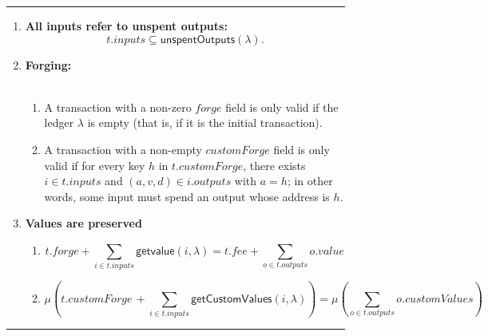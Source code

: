\documentclass[a4paper]{article}
\newcommand{\s}{\textsf}  %
\theoremstyle{definition}  %
\newcommand\rfskip{7pt}
\newenvironment{ruledfigure}[1]{\begin{figure}[#1]\hrule\vspace{\rfskip}}{\vspace{\rfskip}\hrule\end{figure}}
\newcommand{\mi}[1]{\ensuremath{\mathit{#1}}}
\newcommand{\inputs}{\mi{inputs}}
\newcommand{\outputs}{\mi{outputs}}
\newcommand{\forge}{\mi{forge}}
\newcommand{\fee}{\mi{fee}}
\newcommand{\val}{\mi{value}}  %
\newcommand{\customvals}{\mi{customValues}}
\newcommand{\customforge}{\mi{customForge}}
\newcommand{\getvalue}{\msf{getvalue}}
\newcommand{\msf}[1]{\ensuremath{\mathsf{#1}}}
\newcommand{\unspent}{\msf{unspentOutputs}}
\begin{document}
\begin{ruledfigure}{H}
  \begin{enumerate}
    \item \label{rule:all-inputs-refer-to-unspent-outputs-2} \textbf{All
      inputs refer to unspent outputs:}
      \[
        t.\inputs \subseteq \unspent(\lambda).
      \]
    \item\textbf{Forging:}\\\\
      \begin{minipage}{0.85\textwidth}
          \begin{enumerate}
          \item
              A transaction with a non-zero \forge{} field is only
            valid if the ledger $\lambda$ is empty
            (that is, if it is the initial
            transaction). 
          \item \label{rule:custom-forge}
            A transaction with a non-empty \customforge{} field is
            only valid if for every key $h$ in $t.\customforge$, there
            exists $i \in t.\inputs$ and $(a,v,d) \in i.\outputs$ with
            $a =h$; in other words, some input must spend an output
            whose address is $h$.
          \end{enumerate}
          \end{minipage}
    \item \textbf{Values are preserved}\\
      \begin{minipage}{0.85\textwidth}
          \begin{enumerate}
          \item\label{rule:native-value-is-preserved-2}
            \[
            t.\forge + \sum_{i \in t.\inputs} \getvalue(i, \lambda) = t.\fee + \sum_{o \in t.\outputs} o.\val
            \]

          \item\label{rule:custom-values-are-preserved-2}
            \[
              \mu\left(t.\customforge\, + \sum_{i \in t.\inputs} \s{getCustomValues}(i, \lambda)\right) =
              \mu\left(\sum_{o \in t.\outputs} o.\customvals\right)
            \]
          \end{enumerate}
          

\end{minipage}
\end{enumerate}
\end{ruledfigure}
\end{document}
